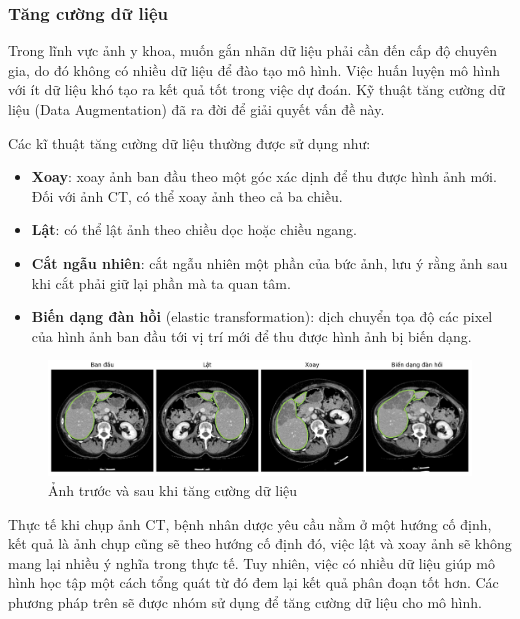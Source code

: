 \subsubsection{Tăng cường dữ liệu}
Trong lĩnh vực ảnh y khoa, muốn gắn nhãn dữ liệu phải cần đến cấp độ chuyên gia, do đó không có nhiều dữ liệu để đào tạo mô hình. Việc huấn luyện mô hình với ít dữ liệu khó tạo ra kết quả tốt trong việc dự đoán. Kỹ thuật tăng cường dữ liệu (Data Augmentation) đã ra đời để giải quyết vấn đề này.\par
Các kĩ thuật tăng cường dữ liệu thường được sử dụng như:
\begin{itemize}[topsep=0pt]
    \item \textbf{Xoay}: xoay ảnh ban đầu theo một góc xác dịnh để thu được hình ảnh mới. Đối với ảnh CT, có thể xoay ảnh theo cả ba chiều.
    \item \textbf{Lật}: có thể lật ảnh theo chiều dọc hoặc chiều ngang.
    \item \textbf{Cắt ngẫu nhiên}: cắt ngẫu nhiên một phần của bức ảnh, lưu ý rằng ảnh sau khi cắt phải giữ lại phần mà ta quan tâm.
    \item \textbf{Biến dạng đàn hồi} (elastic transformation): dịch chuyển tọa độ các pixel của hình ảnh ban đầu tới vị trí mới để thu được hình ảnh bị biến dạng.
\end{itemize}
\begin{figure}[H]
    \centering
    \includegraphics[width=14cm]{images/experience/aug.jpg}
    \caption{Ảnh trước và sau khi tăng cường dữ liệu}
\end{figure}
Thực tế khi chụp ảnh CT, bệnh nhân dược yêu cầu nằm ở một hướng cố định, kết quả là ảnh chụp cũng sẽ theo hướng cố định đó, việc lật và xoay ảnh sẽ không mang lại nhiều ý nghĩa trong thực tế. Tuy nhiên, việc có nhiều dữ liệu giúp mô hình học tập một cách tổng quát từ đó đem lại kết quả phân đoạn tốt hơn. Các phương pháp trên sẽ được nhóm sử dụng để tăng cường dữ liệu cho mô hình. \par

